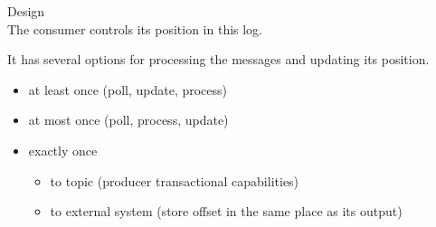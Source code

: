 \begin{frame}[plain,t]{Design} %
     \\
    \vspace{2ex}
    The consumer controls its position in this log. 
    
    \vspace{2ex}
    It has several options for processing the messages and updating its position.
    
    \vspace{2ex}
    \begin{itemize}
        \item at least once (poll, update, process)
        \item at most once (poll, process, update)
        \item exactly once
        \begin{itemize}
            \item to topic (producer transactional capabilities)
            \item to external system (store offset in the same place as its output)
            
        \end{itemize}
    \end{itemize}
    
    
    
\end{frame}

